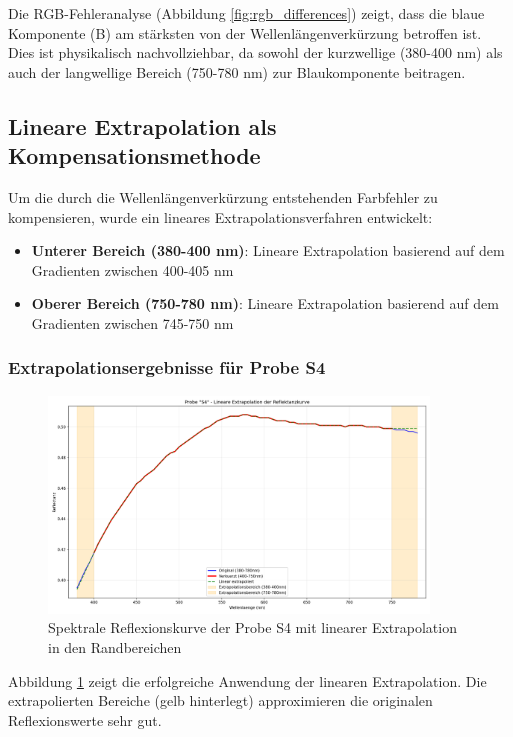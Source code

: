 Die RGB-Fehleranalyse (Abbildung \ref{fig:rgb_differences}) zeigt, dass die blaue Komponente (B) am stärksten von der Wellenlängenverkürzung betroffen ist. Dies ist physikalisch nachvollziehbar, da sowohl der kurzwellige (380-400 nm) als auch der langwellige Bereich (750-780 nm) zur Blaukomponente beitragen.

\subsection{Lineare Extrapolation als Kompensationsmethode}

Um die durch die Wellenlängenverkürzung entstehenden Farbfehler zu kompensieren, wurde ein lineares Extrapolationsverfahren entwickelt:

\begin{itemize}
    \item \textbf{Unterer Bereich (380-400 nm)}: Lineare Extrapolation basierend auf dem Gradienten zwischen 400-405 nm
    \item \textbf{Oberer Bereich (750-780 nm)}: Lineare Extrapolation basierend auf dem Gradienten zwischen 745-750 nm
\end{itemize}

\subsubsection{Extrapolationsergebnisse für Probe S4}

\begin{figure}[htbp]
    \centering
    \includegraphics[width=0.9\textwidth]{./figures/S4_extrapolation_reflektanz.png}
    \caption{Spektrale Reflexionskurve der Probe S4 mit linearer Extrapolation in den Randbereichen}
    \label{fig:s4_extrapolation}
\end{figure}

Abbildung \ref{fig:s4_extrapolation} zeigt die erfolgreiche Anwendung der linearen Extrapolation. Die extrapolierten Bereiche (gelb hinterlegt) approximieren die originalen Reflexionswerte sehr gut.

